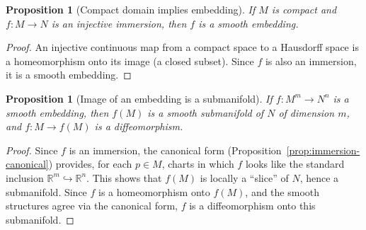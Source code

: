 \documentclass[12pt,a4paper,openany]{book}
\newtheorem{proposition}[theorem]{Proposition}
\theoremstyle{definition}
\theoremstyle{remark}
\newcommand{\R}{\mathbb{R}}
\begin{document}
\begin{proposition}[Compact domain implies embedding]\label{prop:compact-embedding}
If $M$ is compact and $f \colon M \to N$ is an injective immersion, then
$f$ is a smooth embedding.
\end{proposition}

\begin{proof}
An injective continuous map from a compact space to a Hausdorff space is
a homeomorphism onto its image (a closed subset).  Since $f$ is also an
immersion, it is a smooth embedding.
\end{proof}

\begin{proposition}[Image of an embedding is a submanifold]
\label{prop:embedding-image}
If $f \colon M^m \to N^n$ is a smooth embedding, then $f(M)$ is a smooth
submanifold of $N$ of dimension $m$, and $f \colon M \to f(M)$ is a
diffeomorphism.
\end{proposition}

\begin{proof}
Since $f$ is an immersion, the canonical form
(Proposition~\ref{prop:immersion-canonical}) provides, for each $p \in M$,
charts in which $f$ looks like the standard inclusion
$\R^m \hookrightarrow \R^n$.  This shows that $f(M)$ is locally a ``slice''
of $N$, hence a submanifold.  Since $f$ is a homeomorphism onto $f(M)$, and
the smooth structures agree via the canonical form, $f$ is a diffeomorphism
onto this submanifold.
\end{proof}

\end{document}
